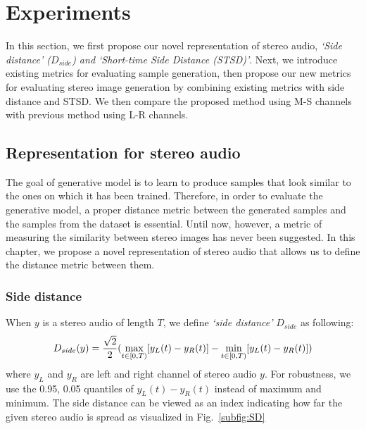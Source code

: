\section{Experiments}
\label{sec:experiment}

In this section, we first propose our novel representation of stereo audio, \textit{`Side distance' ($D_{side}$) and `Short-time Side Distance (STSD)'}. Next, we introduce existing metrics for evaluating sample generation, then propose our new metrics for evaluating stereo image generation by combining existing metrics with side distance and STSD. We then compare the proposed method using M-S channels with previous method using L-R channels.

\subsection{Representation for stereo audio}
\label{subsec:representation}
The goal of generative model is to learn to produce samples that look similar to the ones on which it has been trained. Therefore, in order to evaluate the generative model, a proper distance metric between the generated samples and the samples from the dataset is essential. Until now, however, a metric of measuring the similarity between stereo images has never been suggested. In this chapter, we propose a novel representation of stereo audio that allows us to define the distance metric between them.

\subsubsection{Side distance}
\label{subsubsec:side_distance}

When $y$ is a stereo audio of length $T$, we define \textit{`side distance'} $D_{side}$ as following:
\begin{equation}
    D_{side}(y) = {\sqrt{2} \over 2}(\max_{t \in [0, T)} [y_L(t) - y_R(t)] - \min_{t \in [0, T)} [y_L(t) - y_R(t)])
\end{equation}
where $y_L$ and $y_R$ are left and right channel of stereo audio $y$. For robustness, we use the 0.95, 0.05 quantiles of $y_L(t) - y_R(t)$ instead of maximum and minimum. The side distance can be viewed as an index indicating how far the given stereo audio is spread as visualized in Fig.~\ref{subfig:SD}

